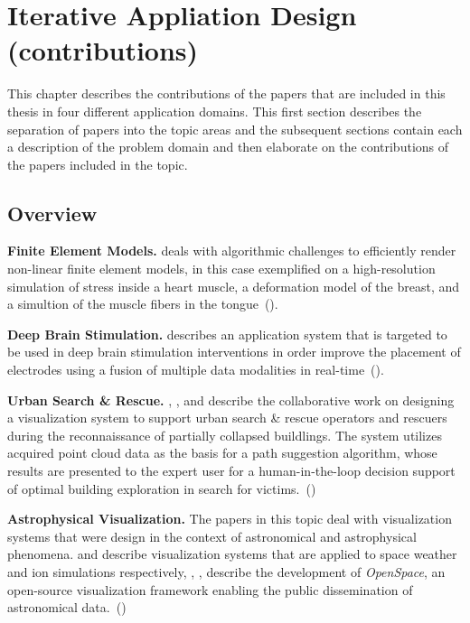 
\chapter{Iterative Appliation Design (contributions)}
\label{cha:contributions}

This chapter describes the contributions of the papers that are included in this thesis in four different application domains.  This first section describes the separation of papers into the topic areas and the subsequent sections contain each a description of the problem domain and then elaborate on the contributions of the papers included in the topic.

\section{Overview} \label{contributions:overview}

\textbf{Finite Element Models. }  deals with algorithmic challenges to efficiently render non-linear finite element models, in this case exemplified on a high-resolution simulation of stress inside a heart muscle, a deformation model of the breast, and a simultion of the muscle fibers in the tongue~().

\textbf{Deep Brain Stimulation. }  describes an application system that is targeted to be used in deep brain stimulation interventions in order improve the placement of electrodes using a fusion of multiple data modalities in real-time~().

\textbf{Urban Search \& Rescue. } , , and  describe the collaborative work on designing a visualization system to support urban search \& rescue operators and rescuers during the reconnaissance of partially collapsed buildlings.  The system utilizes acquired  point cloud data as the basis for a path suggestion algorithm, whose results are presented to the expert user for a human-in-the-loop decision support of optimal building exploration in search for victims.~()

\textbf{Astrophysical Visualization. } The papers in this topic deal with visualization systems that were design in the context of astronomical and astrophysical phenomena.  and  describe visualization systems that are applied to space weather and ion simulations respectively, , ,  describe the development of \emph{OpenSpace}, an open-source visualization framework enabling the public dissemination of astronomical data.~()


